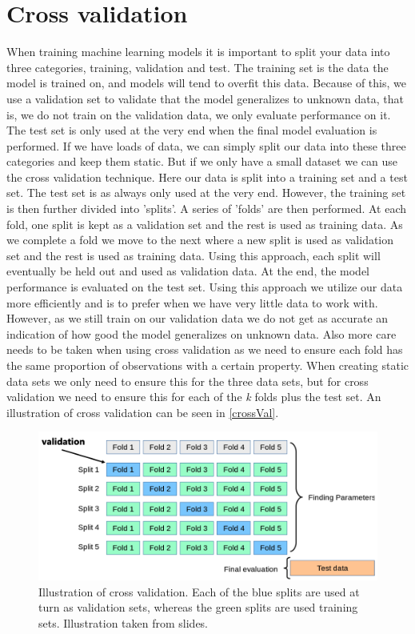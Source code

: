 \section{Cross validation}
When training machine learning models it is important to split your data into three categories, training, validation and test. The training set is the data the model is trained on, and models will tend to overfit this data. Because of this, we use a validation set to validate that the model generalizes to unknown data, that is, we do not train on the validation data, we only evaluate performance on it. The test set is only used at the very end when the final model evaluation is performed. If we have loads of data, we can simply split our data into these three categories and keep them static. But if we only have a small dataset we can use the cross validation technique. Here our data is split into a training set and a test set. The test set is as always only used at the very end. However, the training set is then further divided into 'splits'. A series of 'folds' are then performed. At each fold, one split is kept as a validation set and the rest is used as training data. As we complete a fold we move to the next where a new split is used as validation set and the rest is used as training data. Using this approach, each split will eventually be held out and used as validation data. At the end, the model performance is evaluated on the test set. Using this approach we utilize our data more efficiently and is to prefer when we have very little data to work with. However, as we still train on our validation data we do not get as accurate an indication of how good the model generalizes on unknown data. Also more care needs to be taken when using cross validation as we need to ensure each fold has the same proportion of observations with a certain property. When creating static data sets we only need to ensure this for the three data sets, but for cross validation we need to ensure this for each of the \textit{k} folds plus the test set. An illustration of cross validation can be seen in \autoref{crossVal}.
\begin{figure}
	\centering
	\includegraphics[width=0.83\linewidth]{Materials/crossValidation}
	\caption{Illustration of cross validation. Each of the blue splits are used at turn as validation sets, whereas the green splits are used training sets. Illustration taken from slides.}
	\label{crossVal}
\end{figure}